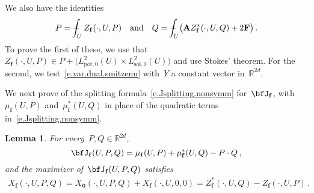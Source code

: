 \documentclass[11pt,twoside]{article} %
\numberwithin{equation}{section}
\newtheorem{lemma}[theorem]{Lemma}
\theoremstyle{definition}
\newcommand*{\R}{\ensuremath{\mathbb{R}}}
\newcommand{\f}{\mathbf{f}}
\newcommand{\bfzero}{\boldsymbol{0}}
\def\Xint#1{\mathchoice
{\XXint\displaystyle\textstyle{#1}}%
{\XXint\textstyle\scriptstyle{#1}}%
{\XXint\scriptstyle\scriptscriptstyle{#1}}%
{\XXint\scriptscriptstyle\scriptscriptstyle{#1}}%
\!\int}
\def\XXint#1#2#3{{\setbox0=\hbox{$#1{#2#3}{\int}$}
\vcenter{\hbox{$#2#3$}}\kern-.5\wd0}}
\def\fint{\Xint-}
\newcommand{\Lsolo}{L^2_{\mathrm{sol,0}}}
\newcommand{\Lpoto}{L^2_{\mathrm{pot,0}}}
\newcommand{\bfA}{\mathbf{A}}
\newcommand{\bfF}{\mathbf{F}}
\begin{document}
We also have the identities
\begin{equation}
\label{e.trivial.blitzen}
P = \fint_U Z_{\f}(\cdot,U,P)
\quad \mbox{and} \quad 
Q = \fint_U \bigl( \bfA Z^*_{\f}(\cdot,U,Q)+2\bfF\bigr)
\,.
\end{equation}
To prove the first of these, we use that~$Z_{\f}(\cdot,U,P) \in  P+ \bigl( \Lpoto(U) \times  \Lsolo(U) \bigr)$ and use Stokes' theorem. For the second, we test~\eqref{e.var.dual.smitzenn} with~$Y$ a constant vector in~$\R^{2d}$.

\smallskip

We next prove of the splitting formula~\eqref{e.Jsplitting.nonsymm} for~$\bfJ_{\f}$, with~$\mu_{\f}(U,P)$ and~$\mu^*_{\f}(U,Q)$ in place of the quadratic terms in~\eqref{e.Jsplitting.nonsymm}.

\begin{lemma} \label{l.f.varyou.varme}
For every~$P ,Q \in \R^{2d}$, 
\begin{equation}  
\label{e.Jf.repre1}
\bfJ_{\f}(U, P,Q ) = \mu_{\f}(U,P) + \mu_{\f}^*(U,Q) - P \cdot Q \,,
\end{equation}
and the maximizer of~$\bfJ_{\f}(U,P,Q)$ satisfies
\begin{align}  \label{e.Jf.repre2}
X_{\f}(\cdot,U,P,Q) = X_{\bfzero}(\cdot,U,P,Q) + X_{\f}(\cdot,U,0,0) = Z_{\f}^*(\cdot,U,Q) -  Z_{\f}(\cdot,U,P) 
\,.
\end{align}
\end{lemma}
\end{document}
